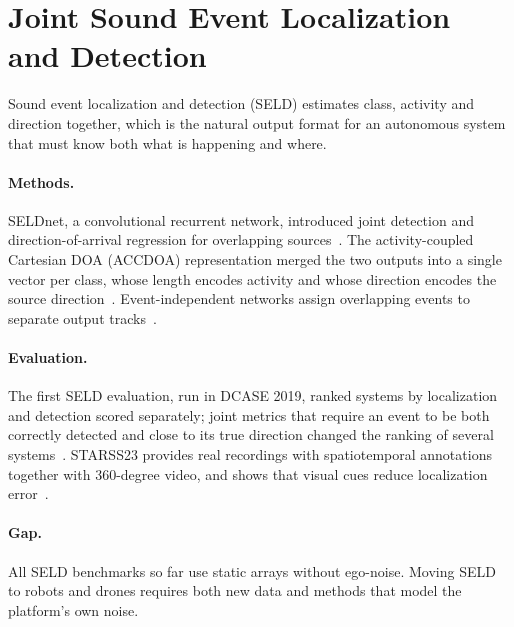 \section{Joint Sound Event Localization and Detection}
\label{sec:seld}

Sound event localization and detection (SELD) estimates class, activity and direction together, which is the natural output format for an autonomous system that must know both what is happening and where.

\paragraph{Methods.}
SELDnet, a convolutional recurrent network, introduced joint detection and direction-of-arrival regression for overlapping sources~\cite{adavanne2019seld}.
The activity-coupled Cartesian DOA (ACCDOA) representation merged the two outputs into a single vector per class, whose length encodes activity and whose direction encodes the source direction~\cite{shimada2021accdoa}.
Event-independent networks assign overlapping events to separate output tracks~\cite{cao2021einv2}.

\paragraph{Evaluation.}
The first SELD evaluation, run in DCASE 2019, ranked systems by localization and detection scored separately; joint metrics that require an event to be both correctly detected and close to its true direction changed the ranking of several systems~\cite{politis2021dcase}.
STARSS23 provides real recordings with spatiotemporal annotations together with 360-degree video, and shows that visual cues reduce localization error~\cite{shimada2023starss23}.

\paragraph{Gap.}
All SELD benchmarks so far use static arrays without ego-noise.
Moving SELD to robots and drones requires both new data and methods that model the platform's own noise.
